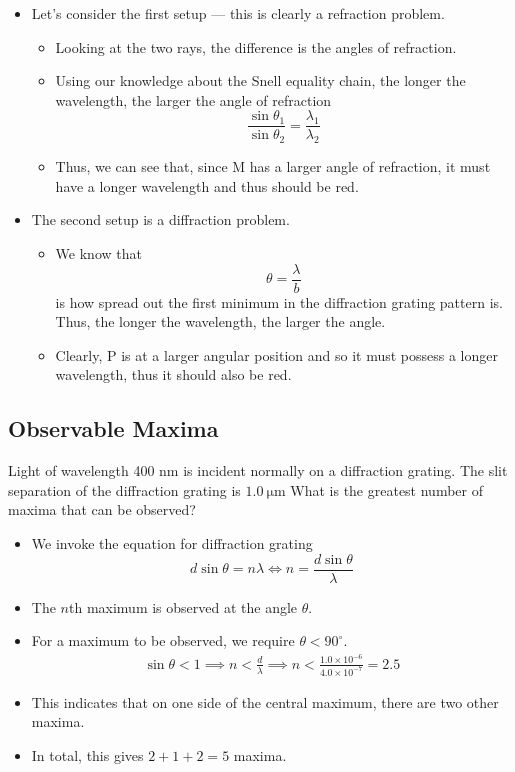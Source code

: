 \documentclass[a4paper,12pt]{article}
\newcommand{\degsym}{^{\circ}}
\begin{document}
\begin{itemize}
  \item Let's consider the first setup --- this is clearly a refraction problem.
        \begin{itemize}
          \item Looking at the two rays, the difference is the angles of refraction.
          \item Using our knowledge about the Snell equality chain, the longer the wavelength, the larger the angle of refraction$$\frac{\sin\theta_1}{\sin\theta_2} = \frac{\lambda_1}{\lambda_2}$$
          \item Thus, we can see that, since M has a larger angle of refraction, it must have a longer wavelength and thus should be red.
        \end{itemize}
  \item The second setup is a diffraction problem.
        \begin{itemize}
          \item We know that $$\theta = \frac{\lambda}{b}$$is how spread out the first minimum in the diffraction grating pattern is. Thus, the longer the wavelength, the larger the angle.
          \item Clearly, P is at a larger angular position and so it must possess a longer wavelength, thus it should also be red.
        \end{itemize}
\end{itemize}

\pagebreak

\subsection{Observable Maxima}

Light of wavelength 400 nm is incident normally on a diffraction
grating. The slit separation of the diffraction grating is $\SI{1.0}{\micro\m}$
What is the greatest number of maxima that can be observed?

\begin{itemize}
  \item We invoke the equation for diffraction grating
        $$d\sin\theta = n\lambda \iff n = \frac{d\sin\theta}{\lambda}$$
  \item The $n$th maximum is observed at the angle $\theta$.
  \item For a maximum to be observed, we require $\theta < 90\degsym$.
        \begin{align*}
          \sin \theta < 1 \implies n < \frac{d}{\lambda} \implies n < \frac{1.0 \times 10^{-6}}{4.0 \times 10^{-7}} = 2.5
        \end{align*}
  \item This indicates that on one side of the central maximum, there are two other maxima.
  \item In total, this gives $2 + 1 + 2 = 5$ maxima.

\end{itemize}
\end{document}
